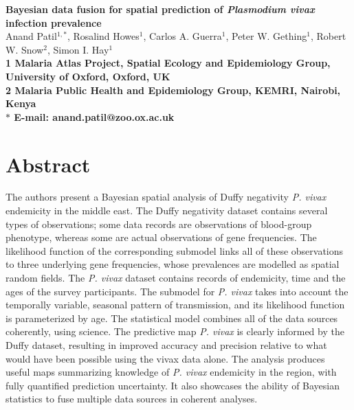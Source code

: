 \documentclass[10pt]{article}
\date{}
\begin{document}
\garamond

\begin{flushleft}
{\Large
\textbf{Bayesian data fusion for spatial prediction of \emph{Plasmodium vivax} infection prevalence}
}
\\
Anand Patil$^{1,\ast}$,  
Rosalind Howes$^{1}$,
Carlos A. Guerra$^1$,
Peter W. Gething$^{1}$,
Robert W. Snow$^2$,
Simon I. Hay$^1$
\\
\bf{1} Malaria Atlas Project, Spatial Ecology and Epidemiology Group, University of Oxford, Oxford, UK
\\
\bf{2} Malaria Public Health and Epidemiology Group, KEMRI, Nairobi, Kenya
\\
$\ast$ E-mail: anand.patil@zoo.ox.ac.uk
\end{flushleft}

\section*{Abstract}

The authors present a Bayesian spatial analysis of Duffy negativity \emph{P. vivax} endemicity in the middle east. The Duffy negativity dataset contains several types of observations; some data records are observations of blood-group phenotype, whereas some are actual observations of gene frequencies. The likelihood function of the corresponding submodel links all of these observations to three underlying gene frequencies, whose prevalences are modelled as spatial random fields. The \emph{P. vivax} dataset contains records of endemicity, time and the ages of the survey participants. The submodel for \emph{P. vivax} takes into account the temporally variable, seasonal pattern of transmission, and its likelihood function is parameterized by age. The statistical model combines all of the data sources coherently, using science. The predictive map \emph{P. vivax} is clearly informed by the Duffy dataset, resulting in improved accuracy and precision relative to what would have been possible using the vivax data alone. The analysis produces useful maps summarizing knowledge of \emph{P. vivax} endemicity in the region, with fully quantified prediction uncertainty. It also showcases the ability of Bayesian statistics to fuse multiple data sources in coherent analyses.
\end{document}
